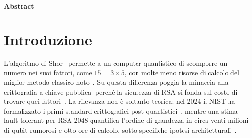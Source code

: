 %
%
%

\clearpage
\thispagestyle{empty}
{}
\vspace*{\fill}
\begin{center}
    {\Huge\bfseries Abstract}
\end{center}
\vspace*{\fill}
\clearpage

\renewcommand{\theequation}{\arabic{equation}}
\renewcommand{\thetable}{\arabic{table}}
\let\abstractACL\addcontentsline
\renewcommand{\addcontentsline}[3]{}

\begingroup
\setlength{\parindent}{0pt}
\setlength{\parskip}{4pt plus 0.5pt minus 0.5pt}

\section*{Introduzione}

L'algoritmo di Shor~\cite{shor1994} permette a un computer quantistico di
scomporre un numero nei suoi fattori, come $15=3\times5$, con molte meno risorse
di calcolo del miglior metodo classico noto~\cite{lenstra1993gnfs}.
Su questa differenza poggia la minaccia alla crittografia a chiave pubblica,
perché la sicurezza di RSA si fonda sul costo di trovare quei
fattori~\cite{rsa1978}.
La rilevanza non è soltanto teorica: nel 2024 il NIST ha formalizzato i primi
standard crittografici post-quantistici~\cite{nist2024pqc}, mentre una stima
fault-tolerant per RSA-2048 quantifica l'ordine di grandezza in circa venti
milioni di qubit rumorosi e otto ore di calcolo, sotto specifiche ipotesi
architetturali~\cite{gidney2021}.


